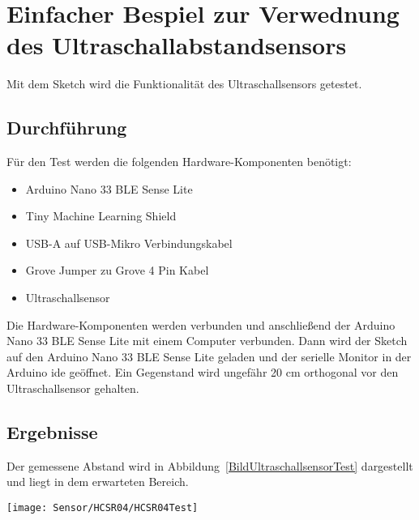 \section{Einfacher Bespiel zur Verwednung des Ultraschallabstandsensors}

Mit dem Sketch  wird die Funktionalität des Ultraschallsensors getestet.

\begin{code}
\end{code}


\subsection{Durchführung}

Für den Test werden die folgenden Hardware-Komponenten benötigt:

\begin{itemize}
    \item Arduino Nano 33 BLE Sense Lite
    \item Tiny Machine Learning Shield
    \item USB-A auf USB-Mikro Verbindungskabel
    \item Grove Jumper zu Grove 4 Pin Kabel
    \item Ultraschallsensor
\end{itemize}

Die Hardware-Komponenten werden verbunden und anschließend der  Arduino Nano 33 BLE Sense Lite mit einem Computer verbunden. Dann wird der Sketch  auf den Arduino Nano 33 BLE Sense Lite geladen und der serielle Monitor in der Arduino \acs{ide} geöffnet. Ein Gegenstand wird ungefähr 20 cm orthogonal vor den Ultraschallsensor gehalten.

\subsection{Ergebnisse}

Der gemessene Abstand wird in Abbildung~\ref{BildUltraschallsensorTest} dargestellt und liegt in dem erwarteten Bereich. 

    \begin{center}
        \texttt{[image: Sensor/HCSR04/HCSR04Test]}
        \label{BildUltraschallsensorTest}
    \end{center}

